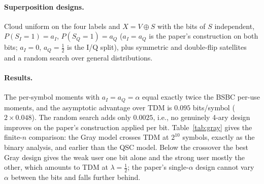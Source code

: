 \documentclass[11pt]{article}
\begin{document}
\paragraph{Superposition designs.} Cloud uniform on the four labels and $X=V\oplus S$ with the bits of $S$ independent, $P(S_I=1)=a_I$, $P(S_Q=1)=a_Q$ ($a_I=a_Q$ is the paper's construction on both bits; $a_I=0$, $a_Q=\frac12$ is the I/Q split), plus symmetric and double-flip satellites and a random search over general distributions.

\paragraph{Results.} The per-symbol moments with $a_I=a_Q=\alpha$ equal exactly twice the BSBC per-use moments, and the asymptotic advantage over TDM is $0.095$ bits/symbol ($2\times0.048$). The random search adds only $0.0025$, i.e., no genuinely 4-ary design improves on the paper's construction applied per bit. Table~\ref{tab:gray} gives the finite-$n$ comparison: the Gray model crosses TDM at $2^{10}$ symbols, exactly as the binary analysis, and earlier than the QSC model. Below the crossover the best Gray design gives the weak user one bit alone and the strong user mostly the other, which amounts to TDM at $\lambda=\frac12$; the paper's single-$\alpha$ design cannot vary $\alpha$ between the bits and falls further behind.

\begin{table}[t]
\centering
\caption{Largest $R_1$ advantage of SUP over TDM (bits/symbol, $\varepsilon=10^{-2}$) for hard-decision Gray QPSK, the paper's BSBC at twice the blocklength, and the QSC model.}
\label{tab:gray}
\end{table}
\end{document}
